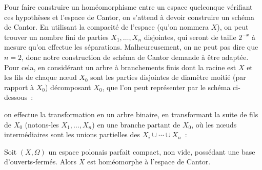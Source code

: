 Pour faire construire un homéomorphisme entre un espace quelconque vérifiant ces
hypothèses et l'espace de Cantor, on s'attend à devoir construire un schéma de
Cantor. En utilisant la compacité de l'espace (qu'on nommera $X$), on peut
trouver un nombre fini de parties $X_1,\ldots,X_n$ disjointes, qui seront
de taille $2^{-x}$ à mesure qu'on effectue les séparations. Malheureusement,
on ne peut pas dire que $n = 2$, donc notre construction de schéma de Cantor
demande à être adaptée. Pour cela, en considérant un arbre à branchements
finis dont la racine est $X$ et les fils de chaque n\oe ud $X_0$ sont les
parties disjointes de diamètre moitié (par rapport à $X_0$) décomposant $X_0$,
que l'on peut représenter par le schéma ci-dessous~:
\begin{center}
\end{center}
on effectue la transformation en un arbre binaire, en transformant
la suite de fils de $X_0$ (notons-les $X_1,\ldots,X_n$) en une branche partant
de $X_0$, où les n\oe uds intermédiaires sont les unions partielles des
$X_i\cup\cdots \cup X_n$~:
\begin{center}
\end{center}

\begin{theorem}
  Soit $(X,\Omega)$ un espace polonais parfait compact, non vide, possédant une
  base d'ouverts-fermés. Alors $X$ est homéomorphe à l'espace de Cantor.
\end{theorem}

